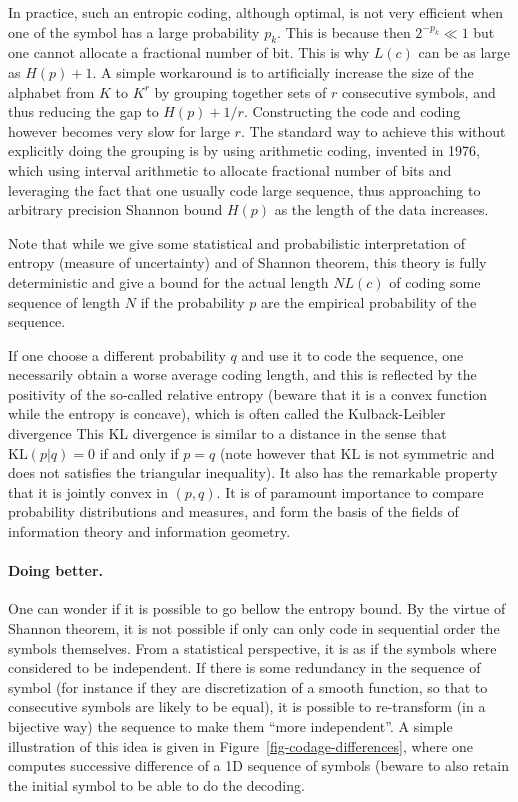 In practice, such an entropic coding, although optimal, is not very efficient when one of the symbol has a large probability $p_k$. This is because then $2^{-p_k} \ll 1$ but one cannot allocate a fractional number of bit. This is why $L(c)$ can be as large as $H(p)+1$. A simple workaround is to artificially increase the size of the alphabet from $K$ to $K^r$ by grouping together sets of $r$ consecutive symbols, and thus reducing the gap to $H(p)+1/r$. Constructing the code and coding however becomes very slow for large $r$. The standard way to achieve this without explicitly doing the grouping is by using arithmetic coding, invented in 1976, which using interval arithmetic to allocate fractional number of bits and leveraging the fact that one usually code large sequence, thus approaching to arbitrary precision Shannon bound $H(p)$ as the length of the data increases.



Note that while we give some statistical and probabilistic interpretation of entropy (measure of uncertainty) and of Shannon theorem, this theory is fully deterministic and give a bound for the actual length $N L(c)$ of coding some sequence of length $N$ if the probability $p$ are the empirical probability of the sequence.

If one choose a different probability $q$ and use it to code the sequence, one necessarily obtain a worse average coding length, and this is reflected by the positivity of the so-called relative entropy (beware that it is a convex function while the entropy is concave), which is often called the Kulback-Leibler divergence
This KL divergence is similar to a distance in the sense that $\text{KL}(p|q)=0$ if and only if $p=q$ (note however that KL is not symmetric and does not satisfies the triangular inequality). It also has the remarkable property that it is jointly convex in $(p,q)$. It is of paramount importance to compare probability distributions and measures, and form the basis of the fields of information theory and information geometry. 


\paragraph{Doing better.}

One can wonder if it is possible to go bellow the entropy bound. By the virtue of Shannon theorem, it is not possible if only can only code in sequential order the symbols themselves. From a statistical perspective, it is as if the symbols where considered to be independent. If there is some redundancy in the sequence of symbol (for instance if they are discretization of a smooth function, so that to consecutive symbols are likely to be equal), it is possible to re-transform (in a bijective way) the sequence to make them ``more independent''. A simple illustration of this idea is given in Figure~\ref{fig-codage-differences}, where one computes successive difference of a 1D sequence of symbols (beware to also retain the initial symbol to be able to do the decoding.

